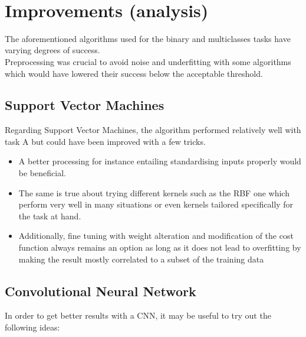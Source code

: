 \documentclass[a4paper,12pt,twoside,twocolumn]{article}
\begin{document}
\pagebreak\\

\section{Improvements (analysis)}
\label{sec:org1d56b84}

The aforementioned algorithms used for the binary and multiclasses tasks have varying degrees of success.\\

Preprocessing was crucial to avoid noise and underfitting with some algorithms which would have lowered their success below the acceptable threshold.\\

\subsection{Support Vector Machines}
\label{sec:org3c42103}

Regarding Support Vector Machines, the algorithm performed relatively well with task A but could have been improved with a few tricks.\\

\begin{itemize}
\item A better processing for instance entailing standardising inputs properly would be beneficial.\\
\item The same is true about trying different kernels such as the RBF one which perform very well in many situations or even kernels tailored specifically for the task at hand.\\
\item Additionally, fine tuning with weight alteration and modification of the cost function always remains an option as long as it does not lead to overfitting by making the result mostly correlated to a subset of the training data\\
\end{itemize}

\subsection{Convolutional Neural Network}
\label{sec:orgbf8ae9e}

In order to get better results with a CNN, it may be useful to try out the following ideas:\\
\end{document}
